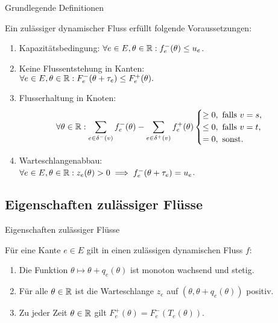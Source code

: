 \begin{frame}{Grundlegende Definitionen}
	\begin{definition}
		Ein zulässiger dynamischer Fluss erfüllt folgende Voraussetzungen:
		\begin{enumerate}[label=(F\arabic*)]
			\pause\item\label{def-feasible-flow-capacity} Kapazitätsbedingung: $\forall e\in E, \theta\in\mathbb{R}: f_e^-(\theta)\leq u_e$.
			\pause\item\label{def-feasible-flow-no-negative-flow} Keine Flussentstehung in Kanten:\\ $\forall e\in E, \theta\in\mathbb{R}: F_e^-(\theta + \tau_e) \leq F_e^+(\theta).$
			\pause\item\label{def-feasible-flow-no-flow-at-node} Flusserhaltung in Knoten:
			\[
			\forall\theta\in\mathbb{R}: \sum_{e\in\delta^-(v)}f^-_e(\theta) - \sum_{e\in\delta^+(v)} f_e^+(\theta) \begin{cases}
				\geq 0, \text{ falls $v=s$,}\\
				\leq 0, \text{ falls $v=t$,}\\
				= 0, \text{ sonst.}
			\end{cases}\]
			\pause\item\label{def-feasible-flow-queue-with-capacity} Warteschlangenabbau:\\
			$\forall e\in E, \theta\in\mathbb{R}: z_e(\theta) > 0 \implies f_e^-(\theta + \tau_e) = u_e$.
		\end{enumerate}
	\end{definition}
\end{frame}

\subsection{Eigenschaften zulässiger Flüsse}
\begin{frame}{Eigenschaften zulässiger Flüsse}
	\begin{proposition}\label{prop-feasible-flow}
		Für eine Kante $e\in E$ gilt in einen zulässigen dynamischen Fluss $f$:
		\begin{enumerate}[label=(\roman*)]
			\item\label{prop-feasible-flow-T-mon-inc-cont} Die Funktion $\theta \mapsto \theta + q_e(\theta)$ ist monoton wachsend und stetig.
			\item\label{prop-feasible-flow-positive-queue} Für alle $\theta\in\mathbb{R}$ ist die Warteschlange $z_e$ auf $(\theta, \theta + q_e(\theta))$ positiv.
			\item\label{prop-feasible-flow-det-outflow} Zu jeder Zeit $\theta\in\mathbb{R}$ gilt $F_e^+(\theta) = F_e^-(T_e(\theta))$.
		\end{enumerate}
	\end{proposition}
\end{frame}

